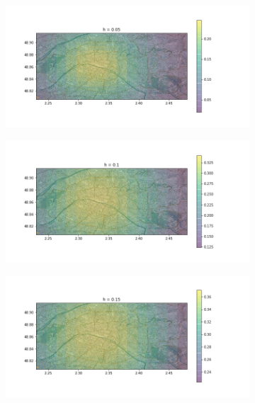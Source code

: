 \documentclass[a4paper,12pt]{article}
\begin{document}
\begin{figure}[h!]
\caption{Gauss comme fonction de Noyau}
\label{fig:tme2_gauss}
\begin{subfigure}{.24\textwidth}
	\centering
	\includegraphics[width=\linewidth]{images/tme2/atms_gauss_0.png}
\end{subfigure}%
\begin{subfigure}{.24\textwidth}
  \centering
	\includegraphics[width=\linewidth]{images/tme2/atms_gauss_1.png}
\end{subfigure}
\begin{subfigure}{.24\textwidth}
  \centering
	\includegraphics[width=\linewidth]{images/tme2/atms_gauss_2.png}

\end{subfigure}
\end{figure}
\end{document}
